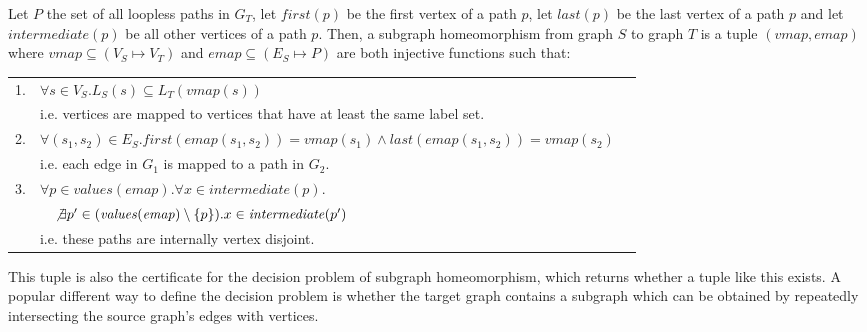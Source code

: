 \begin{defn}
Let $P$ the set of all loopless paths in $G_T$, let $\mathit{first}(p)$ be the first vertex of a path $p$, let $\mathit{last}(p)$ be the last vertex of a path $p$ and let $\mathit{intermediate}(p)$ be all other vertices of a path $p$. Then, a subgraph homeomorphism from graph $S$ to graph $T$ is a tuple $(\mathit{vmap}, \mathit{emap})$ where $\mathit{vmap}\subseteq (V_S \mapsto V_T)$ and $\mathit{emap} \subseteq (E_S \mapsto P)$ are both injective functions such that:

\begin{tabular}{rlr}
 1. & $\forall s \in V_S . L_S(s)\subseteq L_T(\mathit{vmap}(s))$&\\
 
 &i.e. vertices are mapped to vertices that have at least the same label set.&\\
 
 2. & $\forall (s_1, s_2) \in E_S .\mathit{first}(\mathit{emap}(s_1, s_2))=\mathit{vmap}(s_1) \land \mathit{last}(\mathit{emap}(s_1, s_2))=\mathit{vmap}(s_2)$&\\
 &i.e. each edge in $G_1$ is mapped to a path in $G_2$.&\\
 
 3. & $\forall p \in \mathit{values}(\mathit{emap}) . \forall x \in \mathit{intermediate}(p) . $\\
 &$\quad \not \exists p' \in (\mathit{values}(\mathit{emap}) \setminus \{p\}) . x \in \mathit{intermediate}(p')$&\\
    &i.e. these paths are internally vertex disjoint.&\\
\end{tabular}

This tuple is also the certificate for the decision problem of subgraph homeomorphism, which returns whether a tuple like this exists. A popular different way to define the decision problem is whether the target graph contains a subgraph which can be obtained by repeatedly intersecting the source graph's edges with vertices.

\label{def:pathsubgraphisomorphism}
\end{defn}


